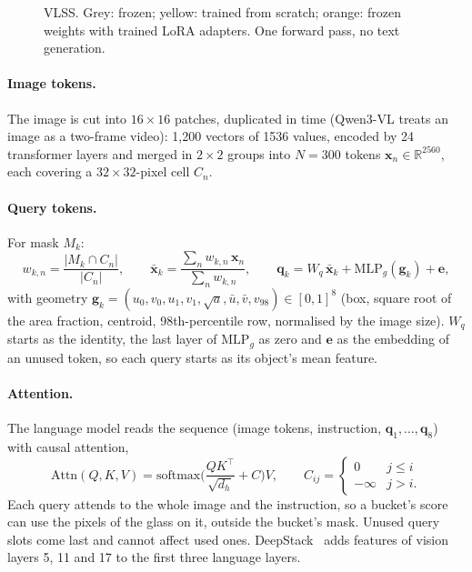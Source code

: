 \documentclass[10pt,a4paper]{article}
\newcommand{\R}{\mathbb{R}}
\begin{document}
\begin{figure}[htbp]
{}
\caption{VLSS. Grey: frozen; yellow: trained from scratch; orange: frozen weights with trained LoRA adapters. One forward pass, no
text generation.}
\label{fig:student}
\end{figure}

\paragraph{Image tokens.} The image is cut into $16\times16$ patches, duplicated in time (Qwen3-VL treats an image as a two-frame
video): 1{,}200 vectors of 1536 values, encoded by 24 transformer layers and merged in $2\times2$ groups into $N=300$ tokens
$\bm x_n\in\R^{2560}$, each covering a $32\times32$-pixel cell $C_n$.

\paragraph{Query tokens.} For mask $M_k$:
\begin{equation}
w_{k,n} = \frac{|M_k\cap C_n|}{|C_n|},\qquad
\bar{\bm x}_k = \frac{\sum_n w_{k,n}\,\bm x_n}{\sum_n w_{k,n}},\qquad
\bm q_k = W_q\,\bar{\bm x}_k + \mathrm{MLP}_g(\bm g_k) + \bm e,
\end{equation}
with geometry $\bm g_k=(u_0,v_0,u_1,v_1,\sqrt a,\bar u,\bar v,v_{98})\in[0,1]^8$ (box, square root of the area fraction, centroid,
98th-percentile row, normalised by the image size). $W_q$ starts as the identity, the last layer of $\mathrm{MLP}_g$ as zero and $\bm e$
as the embedding of an unused token, so each query starts as its object's mean feature.

\paragraph{Attention.} The language model reads the sequence (image tokens, instruction, $\bm q_1,\dots,\bm q_8$) with causal
attention,
\begin{equation}
\mathrm{Attn}(Q,K,V)=\mathrm{softmax}\Big(\frac{QK^\top}{\sqrt{d_h}}+C\Big)V,\qquad C_{ij}=\begin{cases}0 & j\leq i\\ -\infty & j>i.\end{cases}
\end{equation}
Each query attends to the whole
image and the instruction, so a bucket's score can use the pixels of the glass on it, outside the bucket's mask. Unused query slots
come last and cannot affect used ones. DeepStack~\cite{meng2024deepstack} adds features of vision layers 5, 11 and 17 to the
first three language layers.
\end{document}
